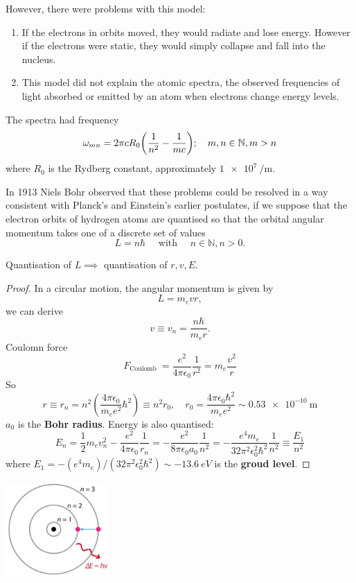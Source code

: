 \documentclass[a4paper]{article}
\begin{document}
However, there were problems with this model:
\begin{enumerate}
	\item If the electrons in orbits moved, they would radiate and lose energy.
	      However if the electrons were static, they would simply collapse and fall into the nucleus.
	\item This model did not explain the atomic spectra, the observed frequencies of light absorbed or emitted by an atom when electrons change energy levels.
\end{enumerate}
The spectra had frequency
\[
	\omega_{mn} = 2 \pi c R_0 \qty(\frac{1}{n^2} - \frac{1}{mc}); \quad m, n \in \mathbb N, m > n
\]
where \( R_0 \) is the Rydberg constant, approximately \( \SI{1e7}{\per\metre} \).

In 1913 Niels Bohr observed that these problems could be resolved in a way consistent with Planck's and Einstein's earlier postulates, if we suppose that the electron orbits of hydrogen atoms are quantised so that the orbital angular momentum takes one of a discrete set of values
\[
L=n \hbar \quad \text { with } \quad n \in \mathbb{N}, n>0 .
\]
\begin{proposition}
    Quantisation of $L \implies $ quantisation of $r,v,E$. 
\end{proposition}
\begin{proof}
    In a circular motion, the angular momentum is given by
\[
L=m_e v r,
\]
we can derive
\[
v \equiv v_n=\frac{n \hbar}{m_e r} .
\]
Coulomn force 
\[
    F_{\text {Coulomb }}=\frac{e^2}{4 \pi \epsilon_0} \frac{1}{r^2}=m_e \frac{v^2}{r} 
\]
So 
\[
    r \equiv r_n=n^2\left(\frac{4 \pi \epsilon_0}{m_e e^2} \hbar^2\right) \equiv n^2 r_0, \quad
        r_0=\frac{4 \pi \epsilon_0 \hbar^2}{m_e e^2} \sim \SI{0.53e-10}{\metre}
\]
$a_0$ is the \textbf{Bohr radius}. Energy is also quantised: 
\[
    E_n=\frac{1}{2} m_e v_n^2-\frac{e^2}{4 \pi \epsilon_0} \frac{1}{r_n}=-\frac{e^2}{8 \pi \epsilon_0 a_0} \frac{1}{n^2}=-\frac{e^4 m_e}{32 \pi^2 \epsilon_0^2 \hbar^2} \frac{1}{n^2} \equiv \frac{E_1}{n^2}
\]
where $ E_1=-\left(e^4 m_e\right) /\left(32 \pi^2 \epsilon_0^2 \hbar^2\right) \sim \SI{-13.6}{eV} $ is the \textbf{groud level}. 
\end{proof}

\begin{center}
    \includegraphics[width=0.3\textwidth]{qm6.png}
\end{center}
\end{document}
